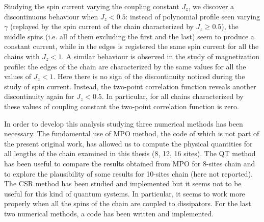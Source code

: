Studying the spin current varying the coupling constant $J_z$, we discover a discontinuous behaviour when $J_z < 0.5$: instead of polynomial profile seen varying $\gamma$ (replayed by the spin current of the chain characterized by $J_z \geq 0.5$), the middle spins (i.e. all of them excluding the first and the last) seem to produce a constant current, while in the edges is registered the same spin current for all the chains with $J_z < 1$. A similar behaviour is observed in the study of magnetization profile: the edges of the chain are characterized by the same values for all the values of $J_z < 1$. Here there is no sign of the discontinuity noticed during the study of spin current. Instead, the two-point correlation function reveals another discontinuity again for $J_z < 0.5$. In particular, for all chains characterized by these values of coupling constant the two-point correlation function is zero.

In order to develop this analysis studying three numerical methods has been necessary. The fundamental use of MPO method, the code of which is not part of the present original work, has allowed us to compute the physical quantities for all lengths of the chain examined in this thesis (8, 12, 16 sites). The QT method has been useful to compare the results obtained from MPO for 8-sites chain and to explore the plausibility of some results for 10-sites chain (here not reported). The CSR method has been studied and implemented but it seems not to be useful for this kind of quantum systems. In particular, it seems to work more properly when all the spins of the chain are coupled to dissipators. For the last two numerical methods, a code has been written and implemented.

